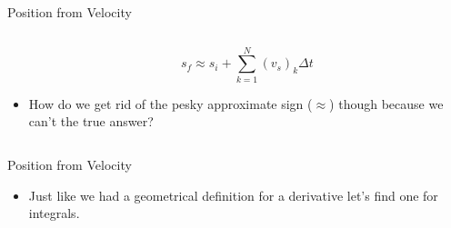 \documentclass{beamer}
\begin{document}
\begin{frame}{Position from Velocity}
\begin{columns}
\begin{column}{0.7\textwidth}
\begin{itemize}
      \begin{equation*}
         s_f \approx s_i + \sum\limits_{k=1}^N (v_s)_k\Delta t
      \end{equation*}
      \item<2-> How do we get rid of the pesky approximate sign ($\approx$) though because we can't the true answer?
   \end{itemize}
\end{column}
\end{columns}
\end{frame}

\begin{frame}{Position from Velocity}
\begin{itemize}
   \item Just like we had a geometrical definition for a derivative let's find one for integrals.
\end{itemize}
\end{frame}
\end{document}
